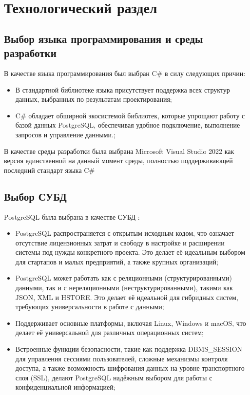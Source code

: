 \chapter{Технологический раздел}

\section{Выбор языка программирования и среды разработки}

В качестве языка программирования был выбран C\# в силу следующих причин:

\begin{itemize}[label=---]
	\item В стандартной библиотеке языка присутствует поддержка всех структур данных, выбранных по результатам проектирования;
	\item C\# обладает обширной экосистемой библиотек, которые упрощают работу с базой данных PostgreSQL, обеспечивая удобное подключение, выполнение запросов и управление данными.;
\end{itemize}

В качестве среды разработки была выбрана Microsoft Visual Studio 2022 как версия единственной на данный момент среды, полностью поддерживающей последний стандарт языка C\#

\section{Выбор СУБД}

PostgreSQL была выбрана в качестве СУБД \cite{5}:
\begin{itemize}[label=---]
	\item PostgreSQL распространяется с открытым исходным кодом, что означает отсутствие лицензионных затрат и свободу в настройке и расширении системы под нужды конкретного проекта. Это делает её идеальным выбором для стартапов и малых предприятий, а также крупных организаций;
	\item PostgreSQL может работать как с реляционными (структурированными) данными, так и с нереляционными (неструктурированными), такими как JSON, XML и HSTORE. Это делает её идеальной для гибридных систем, требующих универсальности в работе с данными;
	\item Поддерживает основные платформы, включая Linux, Windows и macOS, что делает её универсальной для различных операционных систем;
	\item Встроенные функции безопасности, такие как поддержка DBMS\_SESSION для управления сессиями пользователей, сложные механизмы контроля доступа, а также возможность шифрования данных на уровне транспортного слоя (SSL), делают PostgreSQL надёжным выбором для работы с конфиденциальной информацией;
\end{itemize}
 	
